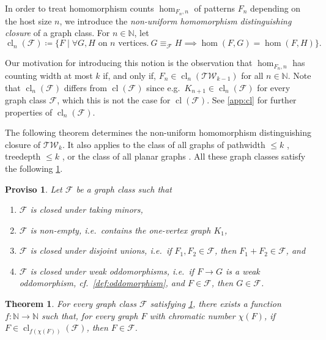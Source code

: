 \documentclass[10pt,a4paper]{article}
\theoremstyle{definition}
\theoremstyle{plain}
\newtheorem{theorem}[definition]{Theorem}
\newtheorem{proviso}[definition]{Proviso}
\theoremstyle{remark}
\DeclareMathOperator{\cl}{cl}
\begin{document}
	In order to treat homomorphism counts $\hom_{F_n, n}$ of patterns $F_n$ depending on the host size $n$,
	we introduce the \emph{non-uniform homomorphism distinguishing closure} of a graph class.
	For $n \in \mathbb{N}$, let
	\[
		\cl_n(\mathcal{F}) \coloneqq \{F \mid \forall G, H \text{ on $n$ vertices}.\ G \equiv_{\mathcal{F}} H \implies \hom(F, G) = \hom(F, H)\}.
	\]

	Our motivation for introducing this notion is the observation that 
	$\hom_{F_n, n}$ has counting width at most $k$
	if, and only if,
	$F_n \in \cl_n(\mathcal{TW}_{k-1})$ for all $n \in \mathbb{N}$.
	Note that $\cl_n(\mathcal{F})$ differs from $\cl(\mathcal{F})$
	since e.g.\ $K_{n+1} \in \cl_n(\mathcal{F})$ for every graph class $\mathcal{F}$,
	which this is not the case for $\cl(\mathcal{F})$.
	See \cref{app:cl} for further properties of $\cl_n(\mathcal{F})$.
	
	The following theorem
	determines the non-uniform homomorphism distinguishing closure
	of $\mathcal{TW}_k$.
	It also applies to the class of all graphs of pathwidth $\leq k$ \cite{seppelt_homomorphism_2024},
	treedepth $\leq k$ \cite{fluck_going_2024},
	or the class of all planar graphs \cite{roberson_oddomorphisms_2022}.
	All these graph classes satisfy the following \cref{proviso}.
	
	\begin{proviso}\label{proviso}
		Let $\mathcal{F}$ be a graph class such that
		\begin{enumerate}
			\item $\mathcal{F}$ is closed under taking minors,
			\item $\mathcal{F}$ is non-empty, i.e.\ contains the one-vertex graph $K_1$,
			\item $\mathcal{F}$ is closed under disjoint unions, i.e.\ if $F_1, F_2 \in \mathcal{F}$, then $F_1 + F_2 \in \mathcal{F}$, and
			\item $\mathcal{F}$ is closed under weak oddomorphisms, i.e.\ if $F \to G$ is a weak oddomorphism, cf.\ \cref{def:oddomorphism}, and $F \in \mathcal{F}$, then $G \in \mathcal{F}$.
		\end{enumerate}
	\end{proviso}

	
	\begin{theorem}\label{lem:non-uniform-closure}
		For every graph class $\mathcal{F}$ satisfying \cref{proviso},
		there exists a function $f \colon \mathbb{N} \to \mathbb{N}$
		such that, 
		for every graph $F$ with chromatic number $\chi(F)$,
		if $F \in \cl_{f(\chi(F))}(\mathcal{F})$, then $F \in \mathcal{F}$.
	\end{theorem}
	
\end{document}
